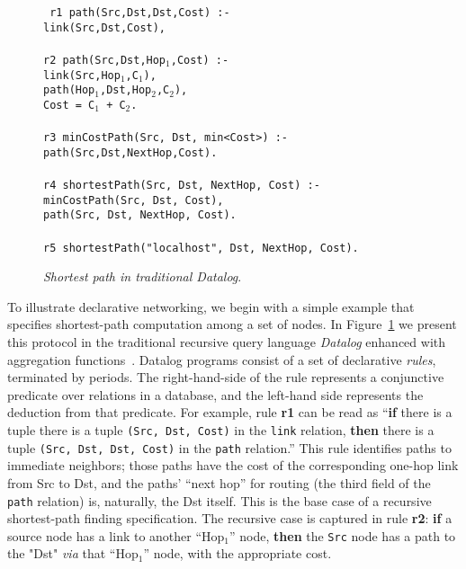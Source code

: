 
\begin{figure}
\centering
\begin{boxedminipage}{\linewidth}
\small{\tt
r1 path(Src,Dst,Dst,Cost) :- \\
\datalogspace link(Src,Dst,Cost), \\
\\
r2 path(Src,Dst,Hop$_1$,Cost) :- \\
\datalogspace link(Src,Hop$_1$,C$_1$), \\
\datalogspace path(Hop$_1$,Dst,Hop$_2$,C$_2$), \\
\datalogspace Cost = C$_1$ + C$_2$. \\
\\
r3 minCostPath(Src, Dst, min<Cost>) :- \\
\datalogspace path(Src,Dst,NextHop,Cost). \\
\\
r4 shortestPath(Src, Dst, NextHop, Cost) :- \\
\datalogspace minCostPath(Src, Dst, Cost), \\
\datalogspace path(Src, Dst, NextHop, Cost). \\
\\
r5 shortestPath("localhost", Dst, NextHop, Cost).
}
\small{\caption{\label{fig:datalogSP}\emph{\small Shortest path in traditional Datalog}.}}
\end{boxedminipage}
\end{figure}

To illustrate declarative networking, we begin with a simple example
that specifies shortest-path computation among a set of nodes.  In
Figure~\ref{fig:datalogSP} we present this protocol in the traditional
recursive query language {\em Datalog} enhanced with aggregation
functions~\cite{greco99}.  Datalog programs consist of a set of
declarative {\em rules}, terminated by periods.  The right-hand-side
of the rule represents a conjunctive predicate over relations in a
database, and the left-hand side represents the deduction from that
predicate.  For example, rule {\bf r1} can be read as ``{\bf if} there
is a tuple there is a tuple {\tt (Src, Dst, Cost)} in the {\tt link} relation, 
{\bf then} there is a tuple {\tt (Src, Dst, Dst, Cost)} in
the {\tt path} relation.''  This rule identifies paths to immediate 
neighbors; those paths have the cost of the
corresponding one-hop link from Src to Dst, and the paths' ``next
hop'' for routing (the third field of the {\tt path} relation) is,
naturally, the Dst itself.  This is the base case of a recursive
shortest-path finding specification.  The recursive case is captured in rule
{\bf r2}: {\bf if} a source node has a link to another ``Hop$_1$'' node, 
{\bf then} the {\tt Src} node has a path to the "Dst" {\em via} that
``Hop$_1$'' node, with the appropriate cost.

